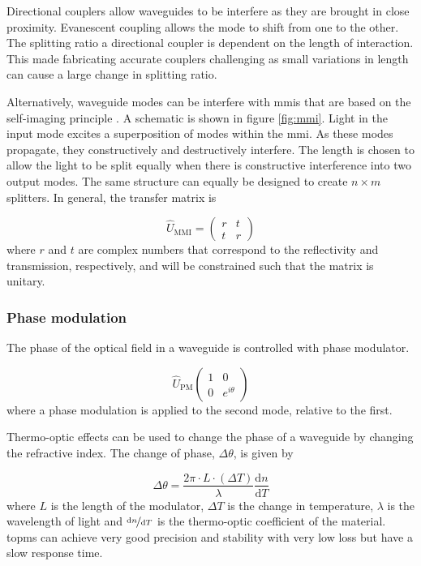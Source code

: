 Directional couplers allow waveguides to be interfere as they are brought in close proximity. Evanescent coupling allows the mode to shift from one to the other. The splitting ratio a directional coupler is dependent on the length of interaction. This made fabricating accurate couplers challenging as small variations in length can cause a large change in splitting ratio.

Alternatively, waveguide modes can be interfere with \acp{mmi} that are based on the self-imaging principle \cite{soldano1995optical}. A schematic is shown in figure \ref{fig:mmi}. Light in the input mode excites a superposition of modes within the \ac{mmi}. As these modes propagate, they constructively and destructively interfere. The length is chosen to allow the light to be split equally when there is constructive interference into two output modes. The same structure can equally be designed to create $n\times m$ splitters. In general, the transfer matrix is

\begin{equation}
	\hat{U}_\mathrm{MMI} = \left(
	\begin{matrix}
	r & t\\
	t & r
	\end{matrix}
	\right)
\end{equation}
where $r$ and $t$ are complex numbers that correspond to the reflectivity and transmission, respectively, and will be constrained such that the matrix is unitary.

\subsubsection*{Phase modulation}

The phase of the optical field in a waveguide is controlled with phase modulator.

\begin{equation}
	\hat{U}_\mathrm{PM}\left(
	\begin{matrix}
	1 & 0\\
	0 & e^{i\theta}
	\end{matrix}
	\right)
\end{equation}
where a phase modulation is applied to the second mode, relative to the first.

Thermo-optic effects can be used to change the phase of a waveguide by changing the refractive index. The change of phase, $\Delta\theta$, is given by

\begin{equation}
	\Delta\theta = \frac{2\pi\cdot L\cdot (\Delta T)}{\lambda}\frac{\mathrm{d}n}{\mathrm{d}T}
\end{equation}
where $L$ is the length of the modulator, $\Delta T$ is the change in temperature, $\lambda$ is the wavelength of light and $\nicefrac{\mathrm{d}n}{\mathrm{d}T}$ is the thermo-optic coefficient of the material. \Acp{topm} can achieve very good precision and stability with very low loss but have a slow response time. 

